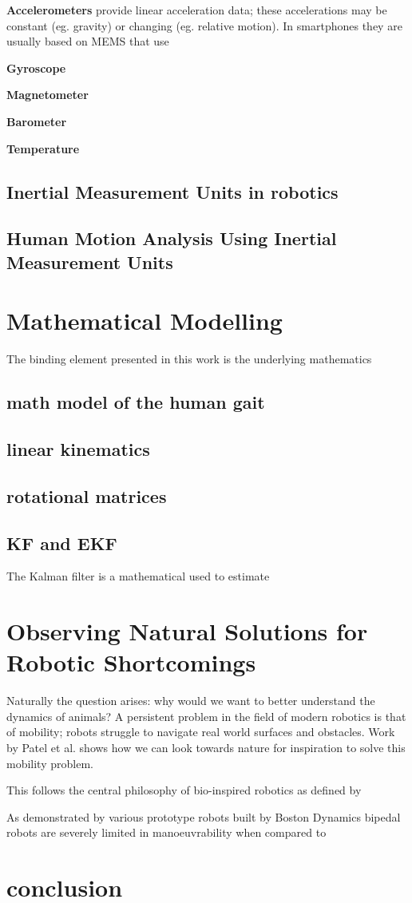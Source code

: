 \textbf{Accelerometers} provide linear acceleration data; these accelerations may be constant (eg. gravity) or changing (eg. relative motion). In smartphones they are usually based on MEMS that use  

\textbf{Gyroscope}

\textbf{Magnetometer}

\textbf{Barometer}

\textbf{Temperature}



\subsection{Inertial Measurement Units in robotics}

\subsection{Human Motion Analysis Using Inertial Measurement Units}


\section{Mathematical Modelling}
The binding element presented in this work is the underlying mathematics

\subsection{math model of the human gait}


\subsection{linear kinematics}

\subsection{rotational matrices}

\subsection{KF and EKF}
The Kalman filter is a mathematical used to estimate



\section{Observing Natural Solutions for Robotic Shortcomings}
Naturally the question arises:  why would we want to better understand the dynamics of animals? A persistent problem in the field of modern robotics is that of mobility; robots struggle to navigate real world surfaces and obstacles. Work by Patel et al. \cite{patel2013rapid} shows how we can look towards nature for inspiration to solve this mobility problem.

This follows the central philosophy of bio-inspired robotics as defined by 

As demonstrated by various prototype robots built by Boston Dynamics bipedal robots are severely limited in manoeuvrability when compared to   

\section{conclusion}









